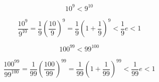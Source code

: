 
$$
10^9 < 9^{10}
$$

$$
\frac{10^9}{9^{10}}
= \frac{1}{9} \left( \frac{10}{9} \right)^9
= \frac{1}{9} \left( 1 + \frac{1}{9} \right)^9
< \frac{1}{9} e < 1
$$

$$
100^{99} < 99^{100}
$$

$$
\frac{100^{99}}{99^{100}}
= \frac{1}{99} \left( \frac{100}{99} \right)^{99}
= \frac{1}{99} \left( 1 + \frac{1}{99} \right)^{99}
< \frac{1}{99} e < 1
$$


